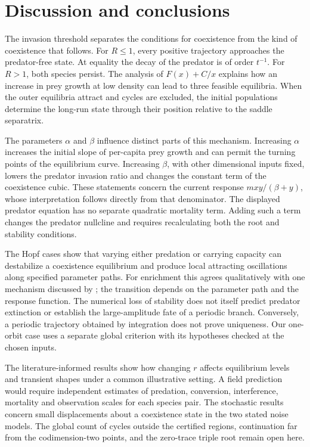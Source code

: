 \section{Discussion and conclusions}\label{sec:discussion}
The invasion threshold separates the conditions for coexistence from the kind of coexistence that follows. For \(R\le1\), every positive trajectory approaches the predator-free state. At equality the decay of the predator is of order \(t^{-1}\). For \(R>1\), both species persist. The analysis of \(F(x)+C/x\) explains how an increase in prey growth at low density can lead to three feasible equilibria. When the outer equilibria attract and cycles are excluded, the initial populations determine the long-run state through their position relative to the saddle separatrix.

The parameters \(\alpha\) and \(\beta\) influence distinct parts of this mechanism. Increasing \(\alpha\) increases the initial slope of per-capita prey growth and can permit the turning points of the equilibrium curve. Increasing \(\beta\), with other dimensional inputs fixed, lowers the predator invasion ratio and changes the constant term of the coexistence cubic. These statements concern the current response \(mxy/(\beta+y)\), whose interpretation follows directly from that denominator. The displayed predator equation has no separate quadratic mortality term. Adding such a term changes the predator nullcline and requires recalculating both the root and stability conditions.

The Hopf cases show that varying either predation or carrying capacity can destabilize a coexistence equilibrium and produce local attracting oscillations along specified parameter paths. For enrichment this agrees qualitatively with one mechanism discussed by \citet{haque11}; the transition depends on the parameter path and the response function. The numerical loss of stability does not itself predict predator extinction or establish the large-amplitude fate of a periodic branch. Conversely, a periodic trajectory obtained by integration does not prove uniqueness. Our one-orbit case uses a separate global criterion with its hypotheses checked at the chosen inputs.

The literature-informed results show how changing \(r\) affects equilibrium levels and transient shapes under a common illustrative setting. A field prediction would require independent estimates of predation, conversion, interference, mortality and observation scales for each species pair. The stochastic results concern small displacements about a coexistence state in the two stated noise models. The global count of cycles outside the certified regions, continuation far from the codimension-two points, and the zero-trace triple root remain open here.

